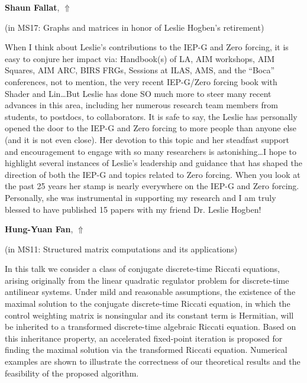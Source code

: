 \documentclass[ILAS2025-program.tex]{subfiles}
\begin{document}
     \hypertarget{down0376}{}\begin{ilasabstract}
    
    \textbf{Shaun Fallat},  \hfill \hyperlink{up0376}{$\Uparrow$}
    
    (in {\color{mstitle}MS17: Graphs and matrices in honor of Leslie Hogben's retirement})
        
        \mtskip
    When I think about Leslie's contributions to the IEP-G and Zero forcing, it is easy to conjure her impact via: Handbook(s) of LA, AIM workshops, AIM Squares, AIM ARC, BIRS FRGs, Sessions at ILAS, AMS, and the ``Boca'' conferences, not to mention, the very recent IEP-G/Zero forcing book with Shader and Lin…But Leslie has done SO much more to steer many recent advances in this area, including her numerous research team members from students, to postdocs, to collaborators. It is safe to say, the Leslie has personally opened the door to the IEP-G and Zero forcing to more people than anyone else (and it is not even close).  Her devotion to this topic and her steadfast support and encouragement to engage with so many researchers is astonishing…I hope to highlight several instances of Leslie's leadership and guidance that has shaped the direction of both the IEP-G and topics related to Zero forcing. When you look at the past 25 years her stamp is nearly everywhere on the IEP-G and Zero forcing. Personally, she was instrumental in supporting my research and I am truly blessed to have published 15 papers with my friend Dr. Leslie Hogben!\end{ilasabstract}
     \hypertarget{down0269}{}\begin{ilasabstract}
    
    \textbf{Hung-Yuan Fan},  \hfill \hyperlink{up0269}{$\Uparrow$}
    
    (in {\color{mstitle}MS11: Structured matrix computations and its applications})
        
        \mtskip
    In this talk we consider a class of conjugate discrete-time Riccati equations, arising originally from the linear quadratic regulator problem for discrete-time antilinear systems. Under mild and reasonable assumptions, the existence of the maximal solution to the conjugate discrete-time Riccati equation, in which the control weighting matrix is nonsingular and its constant term is Hermitian, will be inherited to a transformed discrete-time algebraic Riccati equation. Based on this inheritance property, an accelerated fixed-point iteration is proposed for finding the maximal solution via the transformed Riccati equation. Numerical examples are shown to illustrate the correctness of our theoretical results and the feasibility of the proposed algorithm.\end{ilasabstract}
\end{document}
